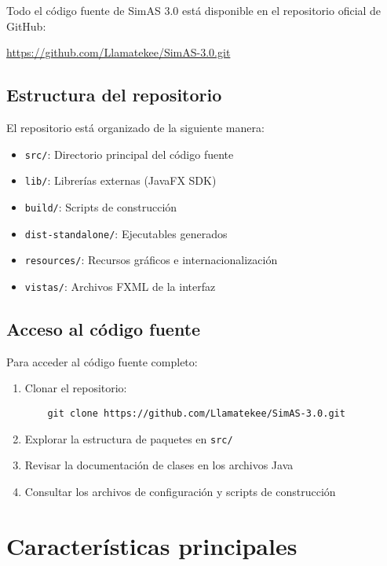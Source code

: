 Todo el código fuente de SimAS 3.0 está disponible en el repositorio oficial de GitHub:

\begin{center}
\url{https://github.com/Llamatekee/SimAS-3.0.git}
\end{center}

\subsection{Estructura del repositorio}

El repositorio está organizado de la siguiente manera:

\begin{itemize}
    \item \texttt{src/}: Directorio principal del código fuente
    \item \texttt{lib/}: Librerías externas (JavaFX SDK)
    \item \texttt{build/}: Scripts de construcción
    \item \texttt{dist-standalone/}: Ejecutables generados
    \item \texttt{resources/}: Recursos gráficos e internacionalización
    \item \texttt{vistas/}: Archivos FXML de la interfaz
\end{itemize}

\subsection{Acceso al código fuente}

Para acceder al código fuente completo:

\begin{enumerate}
    \item Clonar el repositorio:
    \begin{lstlisting}
    git clone https://github.com/Llamatekee/SimAS-3.0.git
    \end{lstlisting}

    \item Explorar la estructura de paquetes en \texttt{src/}
    \item Revisar la documentación de clases en los archivos Java
    \item Consultar los archivos de configuración y scripts de construcción
\end{enumerate}

\section{Características principales}

